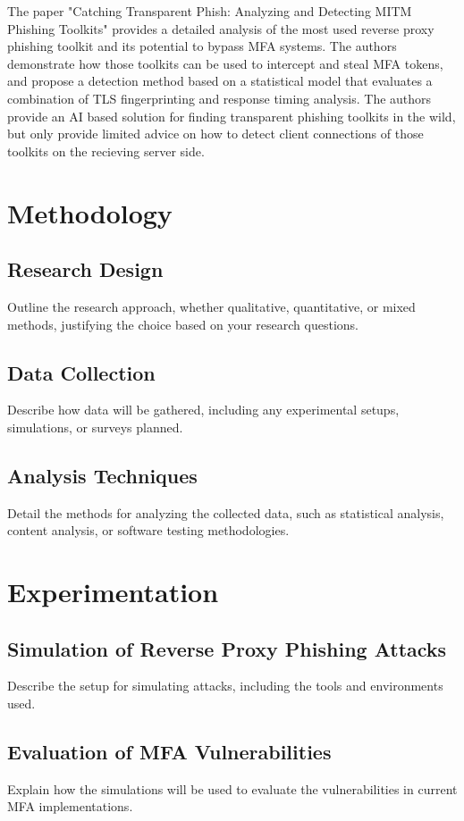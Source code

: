 \documentclass[12pt]{report}
\begin{document}
The paper "Catching Transparent Phish: Analyzing and Detecting MITM Phishing Toolkits" \cite{kondracki2021catching} provides a detailed
analysis of the most used reverse proxy phishing toolkit and its potential to
bypass MFA systems. The authors demonstrate how those toolkits can be used to intercept
and steal MFA tokens, and propose a detection method based on a statistical
model that evaluates a combination of TLS fingerprinting and response timing
analysis. The authors provide an AI based solution for finding transparent phishing
toolkits in the wild, but only provide limited advice on how to detect client
connections of those toolkits on the recieving server side.

\newpage

\chapter{Methodology}
\section{Research Design}
Outline the research approach, whether qualitative, quantitative, or mixed
methods, justifying the choice based on your research questions.

\section{Data Collection}
Describe how data will be gathered, including any experimental setups, simulations,
or surveys planned.

\section{Analysis Techniques}
Detail the methods for analyzing the collected data, such as statistical analysis,
content analysis, or software testing methodologies.

\chapter{Experimentation}
\section{Simulation of Reverse Proxy Phishing Attacks}
Describe the setup for simulating attacks, including the tools and
environments used.

\section{Evaluation of MFA Vulnerabilities}
Explain how the simulations will be used to evaluate the vulnerabilities in
current MFA implementations.
\end{document}
